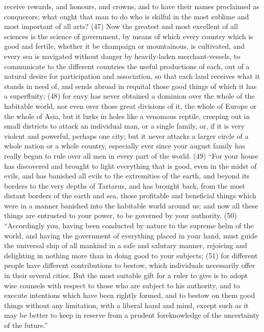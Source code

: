 receive rewards, and honours, and crowns, and to have their names proclaimed as conquerors;
what ought that man to do who is skilful in the most sublime and most important of all arts? (47)
Now the greatest and most excellent of all sciences is the science of government, by means of
which every country which is good and fertile, whether it be champaign or mountainous, is
cultivated, and every sea is navigated without danger by heavily-laden merchant-vessels, to
communicate to the different countries the useful productions of each, out of a natural desire for
participation and association, so that each land receives what it stands in need of, and sends
abroad in requital those good things of which it has a superfluity; (48) for envy has never obtained
a dominion over the whole of the habitable world, nor even over those great divisions of it, the
whole of Europe or the whole of Asia, but it lurks in holes like a venomous reptile, creeping out in
small districts to attack an individual man, or a single family, or, if it is very violent and powerful,
perhaps one city; but it never attacks a larger circle of a whole nation or a whole country,
especially ever since your august family has really begun to rule over all men in every part of the
world. (49) ``For your house has discovered and brought to light everything that is good, even in the
midst of evils, and has banished all evils to the extremities of the earth, and beyond its borders to
the very depths of Tartarus, and has brought back, from the most distant borders of the earth and
sea, those profitable and beneficial things which were in a manner banished into the habitable
world around us; and now all these things are entrusted to your power, to be governed by your
authority. (50) ``Accordingly you, having been conducted by nature to the supreme helm of the
world, and having the government of everything placed in your hand, must guide the universal ship
of all mankind in a safe and salutary manner, rejoicing and delighting in nothing more than in doing
good to your subjects; (51) for different people have different contributions to bestow, which
individuals necessarily offer in their several cities. But the most suitable gift for a ruler to give is to
adopt wise counsels with respect to those who are subject to his authority, and to execute
intentions which have been rightly formed, and to bestow on them good things without any limitation,
with a liberal hand and mind, except such as it may be better to keep in reserve from a prudent
foreknowledge of the uncertainty of the future.''

